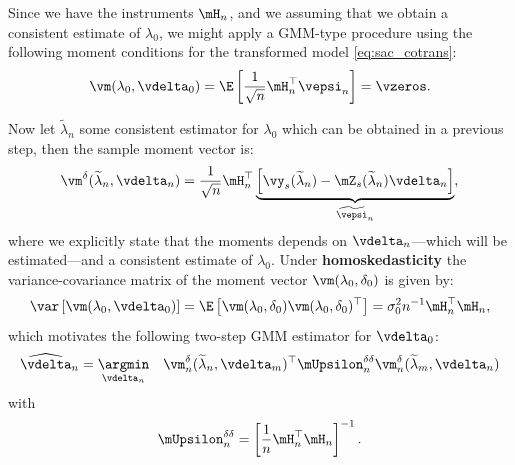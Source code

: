 \documentclass[english,12pt]{book}\usepackage[]{graphicx}\usepackage[]{xcolor}
\begin{document}
Since we have the instruments $\mH_n$, and we assuming that we obtain a consistent estimate of $\lambda_0$, we might apply a GMM-type procedure using the following moment conditions for the transformed model \eqref{eq:sac_cotrans}:
\begin{equation*}
  \vm(\lambda_0, \vdelta_0) = \E\left[\frac{1}{\sqrt{n}}\mH_n^\top\vepsi_n\right] = \vzeros.
\end{equation*}

Now let $\widetilde{\lambda}_n$ some consistent estimator for $\lambda_0$ which can be obtained in a previous step, then the sample moment vector is:
\begin{equation*}
  \vm^{\delta}(\widetilde{\lambda}_n, \vdelta_n) = \frac{1}{\sqrt{n}}\mH^\top_n\underbrace{\left[\vy_s(\widetilde{\lambda}_n) - \mZ_s(\widetilde{\lambda}_n)\vdelta_n\right]}_{\widetilde{\vepsi}_n},
\end{equation*}
%
where we explicitly state that the moments depends on $\vdelta_n$---which will be estimated---and a consistent estimate of $\lambda_0$. Under \textbf{homoskedasticity} the variance-covariance matrix of the moment vector $\vm(\lambda_0, \delta_0)$ is given by:
\begin{equation*}
  \var\left[\vm(\lambda_0, \vdelta_0)\right] = \E\left[\vm(\lambda_0, \delta_0)\vm(\lambda_0, \delta_0)^\top\right] = \sigma^2_0n^{-1}\mH^\top_n\mH_n,
\end{equation*}
%
which motivates the following two-step GMM estimator for $\vdelta_0$:
\begin{equation*}
  \widehat{\vdelta}_n = \underset{\vdelta_n}{\argmin}\quad \vm^{\delta}_n(\widetilde{\lambda}_n, \vdelta_m)^\top \mUpsilon^{\delta\delta}_n\vm^{\delta}_n(\widetilde{\lambda}_m, \vdelta_n)
\end{equation*}
%
with
\begin{equation*}
\mUpsilon^{\delta\delta}_n = \left[\frac{1}{n}\mH^\top_n\mH_n\right]^{-1}.
\end{equation*}
\end{document}
